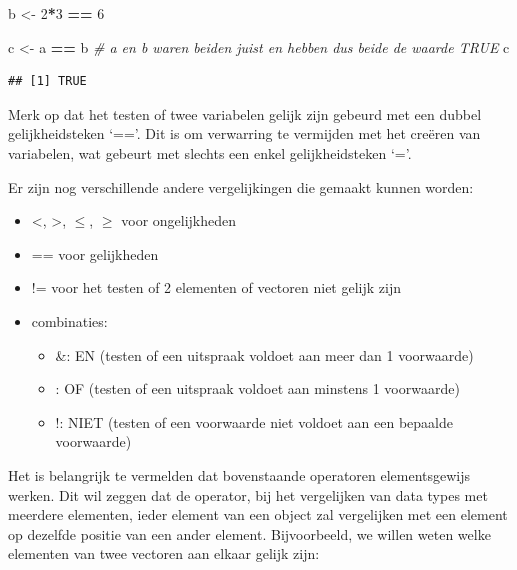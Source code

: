 \documentclass[
]{book}
\newenvironment{Shaded}{\begin{snugshade}}{\end{snugshade}}
\newcommand{\CommentTok}[1]{\textcolor[rgb]{0.56,0.35,0.01}{\textit{#1}}}
\newcommand{\DecValTok}[1]{\textcolor[rgb]{0.00,0.00,0.81}{#1}}
\newcommand{\NormalTok}[1]{#1}
\newcommand{\OtherTok}[1]{\textcolor[rgb]{0.56,0.35,0.01}{#1}}
\newcommand{\SpecialCharTok}[1]{\textcolor[rgb]{0.81,0.36,0.00}{\textbf{#1}}}
\begin{document}
\begin{Shaded}
\begin{Highlighting}[]
\NormalTok{b }\OtherTok{\textless{}{-}} \DecValTok{2}\SpecialCharTok{*}\DecValTok{3} \SpecialCharTok{==} \DecValTok{6}

\NormalTok{c }\OtherTok{\textless{}{-}}\NormalTok{ a }\SpecialCharTok{==}\NormalTok{ b }\CommentTok{\# a en b waren beiden juist en hebben dus beide de waarde \textquotesingle{}TRUE\textquotesingle{}}
\NormalTok{c}
\end{Highlighting}
\end{Shaded}

\begin{verbatim}
## [1] TRUE
\end{verbatim}

Merk op dat het testen of twee variabelen gelijk zijn gebeurd met een dubbel gelijkheidsteken `=='. Dit is om verwarring te vermijden met het creëren van variabelen, wat gebeurt met slechts een enkel gelijkheidsteken `='.

Er zijn nog verschillende andere vergelijkingen die gemaakt kunnen worden:

\begin{itemize}
\item
  \textless, \textgreater, \(\leq\), \(\geq\) voor ongelijkheden
\item
  == voor gelijkheden
\item
  != voor het testen of 2 elementen of vectoren niet gelijk zijn
\item
  combinaties:

  \begin{itemize}
  \item
    \&: EN (testen of een uitspraak voldoet aan meer dan 1 voorwaarde)
  \item
    \textbar: OF (testen of een uitspraak voldoet aan minstens 1 voorwaarde)
  \item
    !: NIET (testen of een voorwaarde niet voldoet aan een bepaalde voorwaarde)
  \end{itemize}
\end{itemize}

Het is belangrijk te vermelden dat bovenstaande operatoren elementsgewijs werken. Dit wil zeggen dat de operator, bij het vergelijken van data types met meerdere elementen, ieder element van een object zal vergelijken met een element op dezelfde positie van een ander element. Bijvoorbeeld, we willen weten welke elementen van twee vectoren aan elkaar gelijk zijn:
\end{document}
